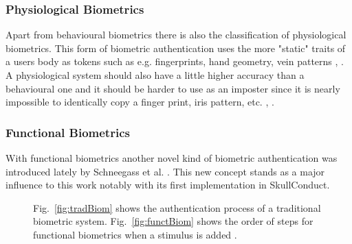 \subsubsection{Physiological Biometrics} Apart from behavioural biometrics there is also the classification of physiological biometrics. This form of biometric authentication uses the more "static" traits of a users body as tokens such as e.g. fingerprints, hand geometry, vein patterns \cite{alsaadi2015physiological}, \cite{faltaous2019vpid}. A physiological system should also have a little higher accuracy than a behavioural one and it should be harder to use as an imposter since it is nearly impossible to identically copy a finger print, iris pattern, etc. \cite{koong2014user}, \cite{delac2004survey}.
\subsubsection{Functional Biometrics} With functional biometrics another novel kind of biometric authentication was introduced lately by Schneegass et al. \cite{schneegass2020functbiometric}. This new concept stands as a major influence to this work notably with its first implementation in SkullConduct\cite{SkullConduct}. 
\begin{figure}
	\begin{center}
		\hspace{0.5cm}
	\end{center}
	\caption{Fig.~\ref{fig:tradBiom} shows the authentication process of a traditional biometric system. Fig.~\ref{fig:functBiom} shows the order of steps for functional biometrics when a stimulus is added \cite{schneegass2020functbiometric}.}
	\label{fig:biometricsVersions}
\end{figure}
